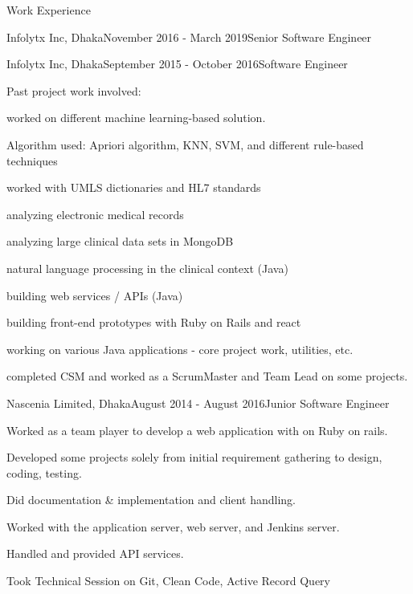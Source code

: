 \documentclass{resume} %
\begin{document}
\begin{rSection}{Work Experience}
\begin{rSubsection}{Infolytx Inc, Dhaka}{November 2016 - March 2019}{Senior Software Engineer}{}
\end{rSubsection}

\begin{rSubsection}{Infolytx Inc, Dhaka}{September 2015 - October 2016}{Software Engineer}{}
\item Past project work involved: 
\item worked on different machine learning-based solution. 
\item Algorithm used:  Apriori algorithm, KNN, SVM, and different rule-based techniques 
\item worked with UMLS dictionaries and HL7 standards
\item analyzing electronic medical records
\item analyzing large clinical data sets in MongoDB
\item natural language processing in the clinical context (Java)
\item building web services / APIs (Java)
\item building front-end prototypes with  Ruby on Rails and react
\item working on various Java applications - core project work, utilities, etc.
\item completed CSM and worked as a ScrumMaster and Team Lead on some projects.
\end{rSubsection}
\newpage
\begin{rSubsection}{Nascenia Limited, Dhaka}{August 2014 - August 2016}{Junior Software Engineer}{}
\item Worked as a team player to develop a web application with on Ruby on rails.
\item Developed some projects solely from initial requirement gathering to design, coding, testing.
\item Did documentation \& implementation and client handling.
\item Worked with the application server, web server, and Jenkins server.
\item Handled and provided API services. 
\item Took Technical Session on Git, Clean Code, Active Record Query 
\end{rSubsection}

\end{rSection}



\end{document}
